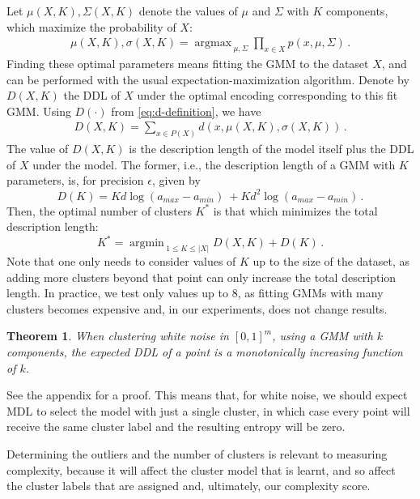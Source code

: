 \documentclass[a4paper,fleqn]{cas-sc}
\DeclareMathOperator*{\argmax}{argmax\,}
\DeclareMathOperator*{\argmin}{argmin\,}
\newtheorem{theorem}{Theorem}
\theoremstyle{remark}
\begin{document}
Let $\mu(X,K), \Sigma(X,K)$ denote the values of $\mu$ and $\Sigma$ with $K$ components, which maximize the probability of $X$:
\begin{gather}
    \mu(X,K), \sigma(X,K) = \argmax_{\mu, \Sigma} \prod_{x \in X} p(x, \mu, \Sigma)\,.
\end{gather}
Finding these optimal parameters means fitting the GMM to the dataset $X$, and can be performed with the usual expectation-maximization algorithm. Denote by $D(X,K)$ the DDL of $X$ under the optimal encoding corresponding to this fit GMM. 
Using $D(\cdot)$ from \eqref{eq:d-definition}, 
we have
\begin{align} \label{eq:dset-dl}
    D(X,K) = \sum_{x \in P(X)} d(x, \mu(X,K), \sigma(X,K))\,.
\end{align}
The value of $D(X,K)$ is the description length of the model itself plus the DDL of $X$ under the model. The former, i.e., the description length of a GMM with $K$ parameters, is, for precision $\epsilon$, given by
\begin{equation} \label{eq:DL-by-K}
    D(K) = Kd\log\left(a_{max}-a_{min}\right)\ + Kd^2\log\left(a_{max}-a_{min}\right)\,.
\end{equation}
Then, the optimal number of clusters $K^*$ is that which minimizes the total description length:
\begin{equation} \label{eq:k-star}
    K^* = \argmin_{1\leq K \leq |X|} D(X,K) + D(K)\,.
\end{equation}
Note that one only needs to consider values of $K$ up to the size of the dataset, as adding more clusters beyond that point can only increase the total description length. In practice, we test only values up to $8$, as fitting GMMs with many clusters becomes expensive and, in our experiments, does not change results. %

\begin{theorem} \label{main-theorem}
When clustering white noise in $[0,1]^m$, using a GMM with $k$ components, the expected DDL of a point is a monotonically increasing function of $k$.
\end{theorem}
See the appendix for a proof. This means that, for white noise, we should expect MDL to select the model with just a single cluster, in which case every point will receive the same cluster label and the resulting entropy will be zero.

Determining the outliers and the number of clusters is relevant to measuring complexity, because it will affect the cluster model that is learnt, and so affect the cluster labels that are assigned and, ultimately, our complexity score.
\end{document}

